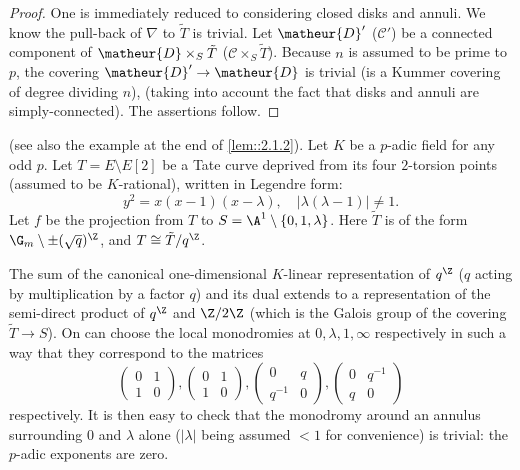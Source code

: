\begin{proof}
 One is immediately reduced to considering closed disks and
 annuli. We know the pull-back of $\nabla$ to $\tilde T$ is trivial. Let
 $\matheur{D}'$ (\resp $\mathcal{C}'$) be a connected component of $\matheur{D}\times_S
 \tilde T$ (\resp $\mathcal{C}\times_S \tilde T$). Because $n$ is assumed
 to be prime to $p$, the covering $\matheur{D}'\to \matheur{D}$ is trivial (\resp is a Kummer
 covering of degree dividing $n$), \cf \cite[6.3.3, 6.3.5]{ecfnas} (taking
 into account the fact that disks and annuli are simply-connected). The
 assertions follow.
\end{proof}

\medskip{} (see also the example at the end of
\ref{lem::2.1.2}). Let $K$ be a $p$-adic field for any odd $p$. 
Let $T=E\setminus E[2]$ be a Tate curve deprived from its four
$2$-torsion points (assumed to be $K$-rational), written in 
Legendre form: 
\begin{equation*}
 y^2=x(x-1)(x-\lambda),\quad |\lambda(\lambda -1)|\neq 1.
\end{equation*}
Let $f$ be the projection from $T$ to $S=\A^1\setminus
\{0,1,\lambda \}$.
Here $\tilde T$ is of the form $\G_m\setminus \pm(\sqrt q)^\Z$, and
$T\cong \tilde T/ q^\Z $.

The sum of the canonical one-dimensional $K$-linear representation of
$q^\Z$ ($q$ acting by multiplication by a factor $q$) and its dual
extends to a representation of the semi-direct product of $q^\Z$ and
$\Z/2\Z$ (which is the Galois group of the covering $\tilde T\to S$). On
can choose the local monodromies at $0,\lambda, 1,\infty$ respectively
in such a way that they correspond to the matrices
\begin{equation*}
 \begin{pmatrix}0&1\\1&0\end{pmatrix},
 \begin{pmatrix}0&1\\1&0\end{pmatrix},
  \begin{pmatrix}0&q\\q^{-1}&0\end{pmatrix},
  \begin{pmatrix}0& q^{-1}\\q&0\end{pmatrix}
\end{equation*}
respectively. It is
then easy to check that the monodromy around an annulus surrounding $0$
and $\lambda$ alone ($|\lambda|$ being assumed $<1$ for convenience) is
trivial: the $p$-adic exponents are zero.
 
